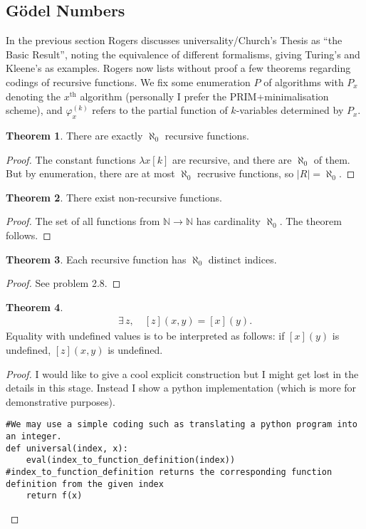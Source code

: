 \documentclass{article}
\newcommand{\aln}{\aleph_0}
\theoremstyle{definition}
\newtheorem{thm}{Theorem}[section]
\begin{document}
\subsection{G\"odel Numbers}
In the previous section Rogers discusses universality/Church's Thesis as ``the Basic Result'', noting the equivalence of different formalisms, giving Turing's and Kleene's as examples. Rogers now lists without proof a few theorems regarding codings of recursive functions. We fix some enumeration $P$ of algorithms with $P_x$ denoting the $x^\text{th}$ algorithm (personally I prefer the PRIM+minimalisation scheme), and $\varphi_x^{(k)}$ refers to the partial function of $k$-variables determined by $P_x$.
\begin{thm}
	There are exactly $\aln$ recursive functions.
\end{thm}
\begin{proof}
	The constant functions $\lambda x[k]$ are recursive, and there are $\aln$ of them. But by enumeration, there are at most $\aln$ recrusive functions, so $|R|=\aln$.
\end{proof}
\begin{thm}
	There exist non-recursive functions.
\end{thm}
\begin{proof}
	The set of all functions from $\mathbb{N}\rightarrow\mathbb{N}$ has cardinality $\aln$. The theorem follows.
\end{proof}
\begin{thm}
	Each recursive function has $\aln$ distinct indices.
\end{thm}
\begin{proof}
	See problem 2.8.
\end{proof}
\begin{thm}
	\begin{align*}
		\exists\,z,\quad[z](x,y)=[x](y).
	\end{align*}
	Equality with undefined values is to be interpreted as follows: if $[x](y)$ is undefined, $[z](x,y)$ is undefined.
\end{thm}
\begin{proof}
	I would like to give a cool explicit construction but I might get lost in the details in this stage. Instead I show a python implementation (which is more for demonstrative purposes).
	\begin{lstlisting}[caption={Example Python code}, label={lst:python}]
#We may use a simple coding such as translating a python program into an integer.
def universal(index, x):
	eval(index_to_function_definition(index)) #index_to_function_definition returns the corresponding function definition from the given index
	return f(x)
	\end{lstlisting}
\end{proof}
\end{document}

